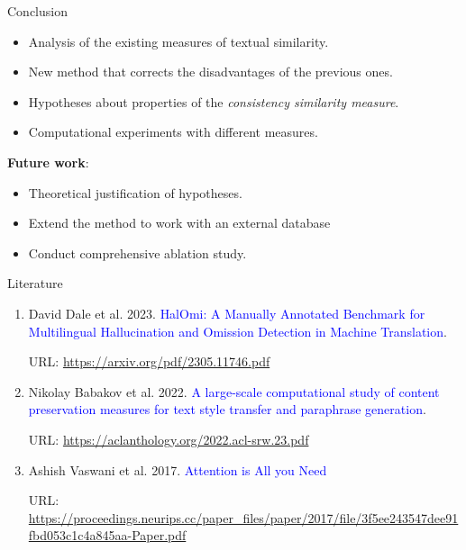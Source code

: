 \documentclass{beamer}
\begin{document}
\begin{frame}{Conclusion}
  \begin{itemize}
      \item Analysis of the existing measures of textual similarity.
      \item New method that corrects the disadvantages of the previous ones.
      \item Hypotheses about properties of the \textit{consistency similarity measure}.
      \item Computational experiments with different measures.
  \end{itemize}

  \textbf{Future work}: 
  \begin{itemize}
      \item Theoretical justification of hypotheses.
      \item Extend the method to work with an external database
      \item Conduct comprehensive ablation study.
  \end{itemize}
\end{frame}

\begin{frame}{Literature}
\begin{enumerate}
    \item David Dale et al. 2023. \textcolor{blue}{HalOmi: A Manually Annotated Benchmark for Multilingual Hallucination and Omission Detection in Machine Translation}.
    
    URL: \url{https://arxiv.org/pdf/2305.11746.pdf}

    \item Nikolay Babakov et al. 2022. \textcolor{blue}{A large-scale computational study of content preservation measures for text style transfer and paraphrase generation}. %

    URL: \url{https://aclanthology.org/2022.acl-srw.23.pdf}

    \item Ashish Vaswani et al. 2017. \textcolor{blue}{Attention is All you Need}

    URL: \url{https://proceedings.neurips.cc/paper_files/paper/2017/file/3f5ee243547dee91fbd053c1c4a845aa-Paper.pdf}
    


  \end{enumerate}
\end{frame}
\end{document}
